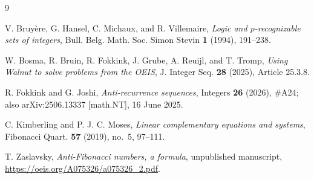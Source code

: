 \documentclass[10pt,reqno]{amsart}
\theoremstyle{plain}
\theoremstyle{definition}
\theoremstyle{remark}
\numberwithin{theorem}{section}
\begin{document}
\begin{thebibliography}{9}
\setlength{\itemsep}{0pt}\setlength{\parsep}{0pt}\setlength{\parskip}{0pt}

V. Bruy\`ere, G. Hansel, C. Michaux, and R. Villemaire,
\emph{Logic and $p$-recognizable sets of integers},
Bull. Belg. Math. Soc. Simon Stevin \textbf{1} (1994), 191--238.

W. Bosma, R. Bruin, R. Fokkink, J. Grube, A. Reuijl, and T. Tromp,
\emph{Using Walnut to solve problems from the OEIS},
J. Integer Seq. \textbf{28} (2025), Article 25.3.8.

R. Fokkink and G. Joshi,
\emph{Anti-recurrence sequences},
Integers \textbf{26} (2026), \#A24;
also arXiv:2506.13337 [math.NT], 16 June 2025.

C. Kimberling and P. J. C. Moses,
\emph{Linear complementary equations and systems},
Fibonacci Quart. \textbf{57} (2019), no.~5, 97--111.

T. Zaslavsky,
\emph{Anti-Fibonacci numbers, a formula},
unpublished manuscript,
\url{https://oeis.org/A075326/a075326_2.pdf}.

\end{thebibliography}
\end{document}
